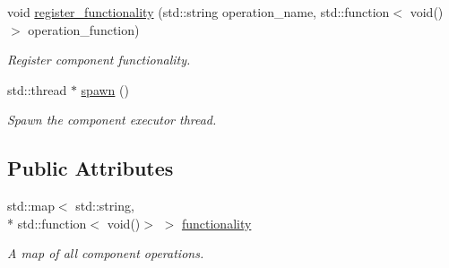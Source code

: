 \begin{DoxyCompactItemize}
void \hyperlink{classzcm_1_1Component_aeb73025f25332f4e5ac86bcb7ecd725f}{register\-\_\-functionality} (std\-::string operation\-\_\-name, std\-::function$<$ void()$>$ operation\-\_\-function)
\begin{DoxyCompactList}\small\item\em Register component functionality. \end{DoxyCompactList}\item 
std\-::thread $\ast$ \hyperlink{classzcm_1_1Component_a328d6f79aab5455e96a2badfdb6bb451}{spawn} ()
\begin{DoxyCompactList}\small\item\em Spawn the component executor thread. \end{DoxyCompactList}\end{DoxyCompactItemize}
\subsection*{Public Attributes}
\begin{DoxyCompactItemize}
\item 
std\-::map$<$ std\-::string, \\*
std\-::function$<$ void()$>$ $>$ \hyperlink{classzcm_1_1Component_a1069ed1d42ae144d60537364450c54c8}{functionality}
\begin{DoxyCompactList}\small\item\em A map of all component operations. \end{DoxyCompactList}\end{DoxyCompactItemize}
